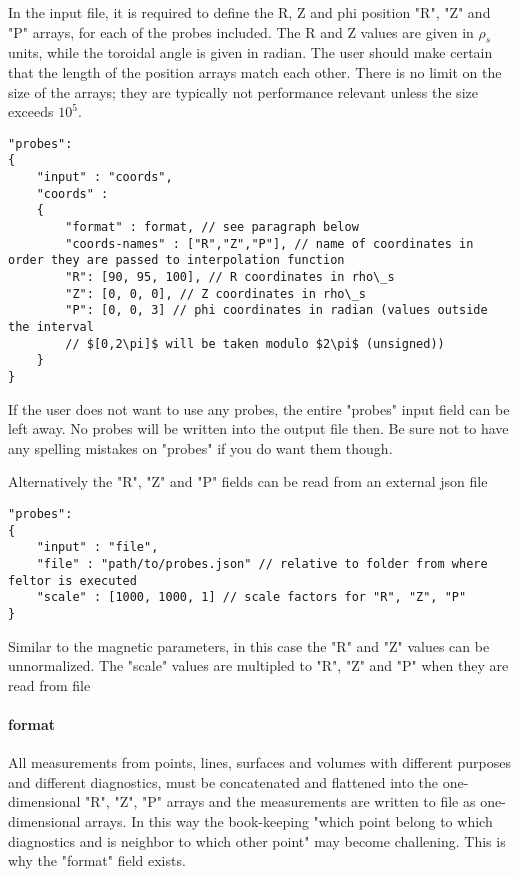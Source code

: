In the input file, it is required to define the R, Z and phi position "R", "Z"
and "P" arrays, for each of the probes included. The R and Z values are
given in $\rho_s$ units, while the toroidal angle is given in radian. The
user should make certain that the length of the position arrays match each
other.
There is no limit on the size of the arrays; they are typically not performance
relevant unless the size exceeds $10^5$.
\begin{verbatim}
"probes":
{
    "input" : "coords",
    "coords" :
    {
        "format" : format, // see paragraph below
        "coords-names" : ["R","Z","P"], // name of coordinates in order they are passed to interpolation function
        "R": [90, 95, 100], // R coordinates in rho\_s
        "Z": [0, 0, 0], // Z coordinates in rho\_s
        "P": [0, 0, 3] // phi coordinates in radian (values outside the interval
        // $[0,2\pi]$ will be taken modulo $2\pi$ (unsigned))
    }
}
\end{verbatim}
\begin{tcolorbox}[title=Note]
 If the user does not want to use any probes, the entire "probes" input field
 can be left away. No probes will be written into the output file then.  Be
 sure not to have any spelling mistakes on "probes" if you do want them though.
\end{tcolorbox}
Alternatively the "R", "Z" and "P" fields can be read from an external json file
\begin{verbatim}
"probes":
{
    "input" : "file",
    "file" : "path/to/probes.json" // relative to folder from where feltor is executed
    "scale" : [1000, 1000, 1] // scale factors for "R", "Z", "P"
}
\end{verbatim}
\begin{tcolorbox}[title=Units of $R$ and $Z$]
Similar to the magnetic parameters, in this case the "R" and "Z" values can be unnormalized.
The "scale" values are multipled to "R", "Z" and "P" when they are read from file
\end{tcolorbox}
\paragraph{format}
All measurements from points, lines, surfaces and volumes with different
purposes and different diagnostics, must be concatenated and flattened into the
one-dimensional "R", "Z", "P" arrays and the measurements are written to file
as one-dimensional arrays.  In this way the book-keeping "which point belong
to which diagnostics and is neighbor to which other point" may become
challening. This is why the "format" field exists.

